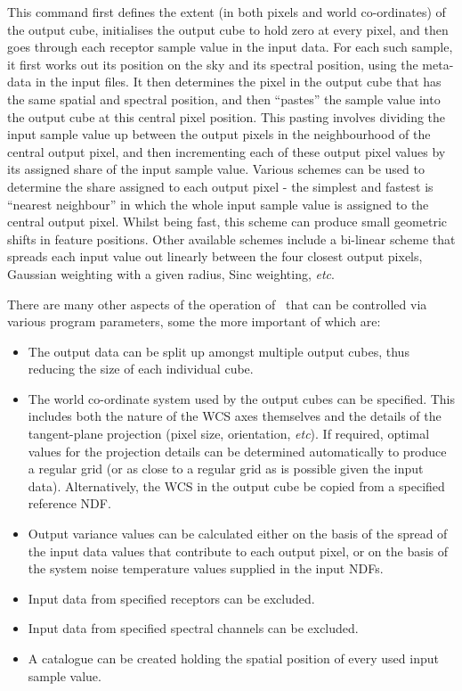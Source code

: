 \documentclass[oneside,11pt]{starlink}
\begin{document}
This command first defines the extent (in both pixels and world
co-ordinates) of the output cube, initialises the output cube to hold
zero at every pixel, and then goes through each receptor sample value in
the input data. For each such sample, it first works out its position on
the sky and its spectral position, using the meta-data in the input
files. It then determines the pixel in the output cube that has the same
spatial and spectral position, and then ``pastes'' the sample value into
the output cube at this central pixel position. This pasting involves
dividing the input sample value up between the output pixels in the
neighbourhood of the central output pixel, and then incrementing each of
these output pixel values by its assigned share of the input sample
value. Various schemes can be used to determine the share assigned to each
output pixel - the simplest and fastest is ``nearest neighbour'' in which
the whole input sample value is assigned to the central output pixel.
Whilst being fast, this scheme can produce small geometric shifts in
feature positions. Other available schemes include a bi-linear scheme
that spreads each input value out linearly between the four closest
output pixels, Gaussian weighting with a given radius, Sinc weighting,
{\em etc}.

There are many other aspects of the operation of \makecube\ that can be
controlled via various program parameters, some the more important of
which are:

\begin{itemize}

\item The output data can be split up amongst multiple output cubes, thus
reducing the size of each individual cube.

\item The world co-ordinate system used by the output cubes can be
specified. This includes both the nature of the WCS axes themselves and
the details of the tangent-plane projection (pixel size, orientation,
{\em etc}). If required, optimal values for the projection details can be
determined automatically to produce a regular grid (or as close to a
regular grid as is possible given the input data). Alternatively, the WCS
in the output cube be copied from a specified reference NDF.

\item Output variance values can be calculated either on the basis
of the spread of the input data values that contribute to each output pixel,
or on the basis of the system noise temperature values supplied in the
input NDFs.

\item Input data from specified receptors can be excluded.

\item Input data from specified spectral channels can be excluded.

\item A catalogue can be created holding the spatial position of every
used input sample value.

\end{itemize}
\end{document}
